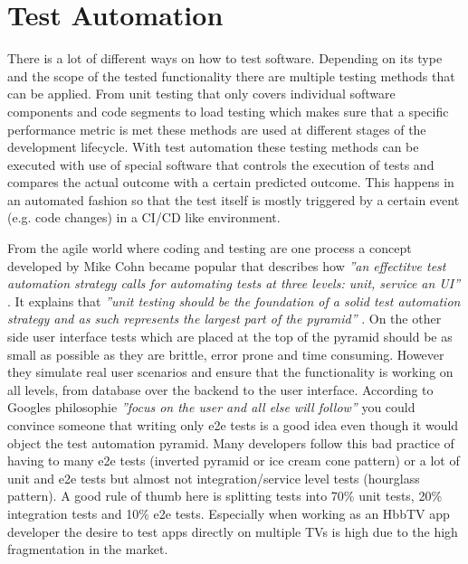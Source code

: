 \section{Test Automation\label{sec:testautomation}}

There is a lot of different ways on how to test software. Depending on its type and the scope of
the tested functionality there are multiple testing methods that can be applied. From unit testing
that only covers individual software components and code segments to load testing which makes sure
that a specific performance metric is met these methods are used at different stages of the
development lifecycle. With test automation these testing methods can be executed with use of
special software that controls the execution of tests and compares the actual outcome with a
certain predicted outcome. This happens in an automated fashion so that the test itself is mostly
triggered by a certain event (e.g. code changes) in a CI/CD like environment.

From the agile world where coding and testing are one process a concept developed by Mike Cohn
became popular that describes how \textit{''an effectitve test automation strategy calls for
automating tests at three levels: unit, service an UI''} \cite{testautomation}. It explains
that \textit{''unit testing should be the foundation of a solid test automation strategy and as
such represents the largest part of the pyramid''} \cite{unittesting}. On the other side
user interface tests which are placed at the top of the pyramid should be as small as possible
as they are brittle, error prone and time consuming. However they simulate real user scenarios
and ensure that the functionality is working on all levels, from database over the backend
to the user interface. According to Googles philosophie \textit{''focus on the user and all
else will follow''} you could convince someone that writing only e2e tests is a good idea
even though it would object the test automation pyramid. Many developers follow this bad
practice of having to many e2e tests (inverted pyramid or ice cream cone pattern) or a lot
of unit and e2e tests but almost not integration/service level tests (hourglass pattern). A good
rule of thumb here is splitting tests into 70\% unit tests, 20\% integration tests and 10\%
e2e tests. Especially when working as an HbbTV app developer the desire to test apps directly
on multiple TVs is high due to the high fragmentation in the market.

